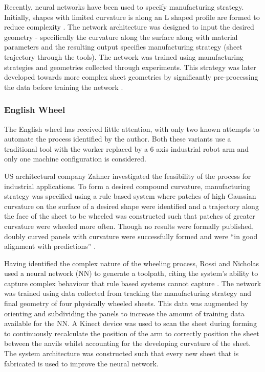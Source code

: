 Recently, neural networks have been used to specify manufacturing strategy. Initially, shapes with limited curvature is along an L shaped profile are formed to reduce complexity \citep{Opritescu2015AutomatedApproach}. The network architecture was designed to input the desired geometry - specifically the curvature along the surface along with material parameters and the resulting output specifies manufacturing strategy (sheet trajectory through the tools). The network was trained using manufacturing strategies and geometries collected through experiments. This strategy was later developed towards more complex sheet geometries by significantly pre-processing the data before training the network \citep{Hartmann2019AnFree-forming}.

\subsubsection*{English Wheel}
The English wheel has received little attention, with only two known attempts to automate the process identified by the author. Both these variants use a traditional tool with the worker replaced by a 6 axis industrial robot arm and only one machine configuration is considered. 

US architectural company Zahner investigated the feasibility of the process for industrial applications. To form a desired compound curvature, manufacturing strategy was specified using a rule based system where patches of high Gaussian curvature on the surface of a desired shape were identified and a trajectory along the face of the sheet to be wheeled was constructed such that patches of greater curvature were wheeled more often. Though no results were formally published, doubly curved panels with curvature were successfully formed and were ``in good alignment with predictions'' \citep{Vazquez2017RoboticWheeling,Vazquez2017EfficientSurfaces}. 

Having identified the complex nature of the wheeling process, Rossi and Nicholas used a neural network (NN) to generate a toolpath, citing the system's ability to capture complex behaviour that rule based systems cannot capture \citep{Rossi2018ModellingWheel, Rossi2018Re/LearningSurfaces}. The network was trained using data collected from tracking the manufacturing strategy and final geometry of four physically wheeled sheets. This data was augmented by orienting and subdividing the panels to increase the amount of training data available for the NN. A Kinect device was used to scan the sheet during forming to continuously recalculate the position of the arm to correctly position the sheet between the anvils whilst accounting for the developing curvature of the sheet. The system architecture was constructed such that every new sheet that is fabricated is used to improve the neural network.

